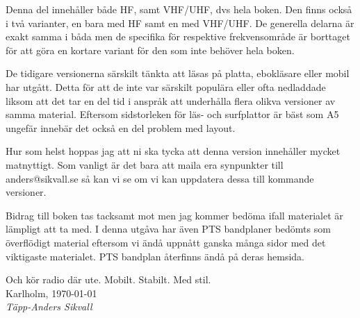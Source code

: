 Denna del innehåller både HF, samt VHF/UHF, dvs hela boken. Den finns
också i två varianter, en bara med HF samt en med VHF/UHF. De
generella delarna är exakt samma i båda men de specifika för
respektive frekvensområde är borttaget för att göra en kortare variant
för den som inte behöver hela boken.

De tidigare versionerna särskilt tänkta att läsas på platta,
ebokläsare eller mobil har utgått. Detta för att de inte var särskilt
populära eller ofta nedladdade liksom att det tar en del tid i anspråk
att underhålla flera olikva versioner av samma material. Eftersom
sidstorleken för läs- och surfplattor är bäst som A5 ungefär innebär
det också en del problem med layout.

Hur som helst hoppas jag att ni ska tycka att denna version innehåller
mycket matnyttigt. Som vanligt är det bara att maila era synpunkter
till anders@sikvall.se så kan vi se om vi kan uppdatera dessa till
kommande versioner.

Bidrag till boken tas tacksamt mot men jag kommer bedöma ifall
materialet är lämpligt att ta med. I denna utgåva har även PTS
bandplaner bedömts som överflödigt material eftersom vi ändå uppnått
ganska många sidor med det viktigaste materialet. PTS bandplan
återfinns ändå på deras hemsida.

Och kör radio där ute. Mobilt. Stabilt. Med stil.\\[4em]

Karlholm, \today\\
\textit{Täpp-Anders Sikvall}

\clearpage
